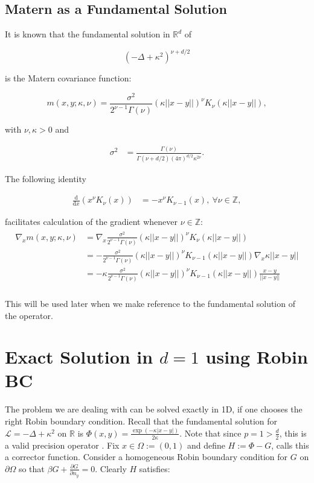 \documentclass[paper=a4, fontsize=11pt]{scrartcl} %
\numberwithin{equation}{section} %
\numberwithin{figure}{section} %
\numberwithin{table}{section} %
\newcommand{\Op}{\mathcal{L}}
\begin{document}
\subsection{Matern as a Fundamental Solution}
It is known \cite{lindgren2011explicit} that the fundamental solution in $\mathbb{R}^d$ of

$$
(-\Delta + \kappa^2)^{ \nu + d/2 }
$$

is the Matern covariance function:

$$
m(x,y; \kappa, \nu ) = \frac{\sigma^2}{2^{\nu-1}\Gamma(\nu)} (\kappa||x-y||)^{\nu} K_{\nu}( \kappa||x-y||), 
$$

with $\nu, \kappa > 0$ and

\begin{align}\label{sig2}
  \sigma^2 &= \frac{\Gamma(\nu)}{\Gamma(\nu + d/2) (4\pi)^{d/2} \kappa^{2\nu}}.
\end{align}

The following identity

\begin{align*}%
  \frac{\text{d}}{\text{d}x} (x^{\nu} K_{\nu}(x)) &= -x^{\nu}K_{\nu-1}(x), \ \forall \nu \in \mathbb{Z},
\end{align*}

facilitates calculation of the gradient whenever $\nu \in \mathbb{Z}$:
\begin{align*}%
  \begin{split}
  \nabla_{x} m( x,y; \kappa, \nu ) &= \nabla_{x} \frac{\sigma^2}{2^{\nu-1}\Gamma(\nu)} (\kappa||x-y||)^{\nu}K_{\nu}(\kappa||x-y||) \\
  &= -\frac{\sigma^2}{2^{\nu-1}\Gamma(\nu)} (\kappa||x-y||)^{\nu}K_{\nu-1}(\kappa||x-y||) \nabla_{x} \kappa||x-y|| \\
  &= -\kappa\frac{\sigma^2}{2^{\nu-1}\Gamma(\nu)} (\kappa||x-y||)^{\nu}K_{\nu-1}(\kappa||x-y||) \frac{x-y}{||x-y||} \\
  \end{split}
\end{align*}

This will be used later when we make reference to the fundamental solution of the operator.

\section{Exact Solution in $d=1$ using Robin BC}
The problem we are dealing with can be solved exactly in 1D, if one chooses the right
Robin boundary condition.
Recall that the fundamental solution for $\Op = -\Delta + \kappa^{2}$ on $\mathbb{R}$ is $\Phi(x,y) = \frac{\exp( -\kappa |x-y| ) }{2\kappa}$. Note that since $p =1 > \frac{d}{2}$, this is a valid precision operator \cite{stuart2010inverse}. Fix $x \in \Omega := (0,1)$ and define $H:=  \Phi - G$,  \cite{evans} calls this a corrector function. 
Consider a homogeneous Robin boundary condition
for $G$ on $\partial \Omega$ so that $\beta G + \frac{ \partial G}{\partial n_{y}} = 0$.
Clearly $H$ satisfies:
\end{document}
